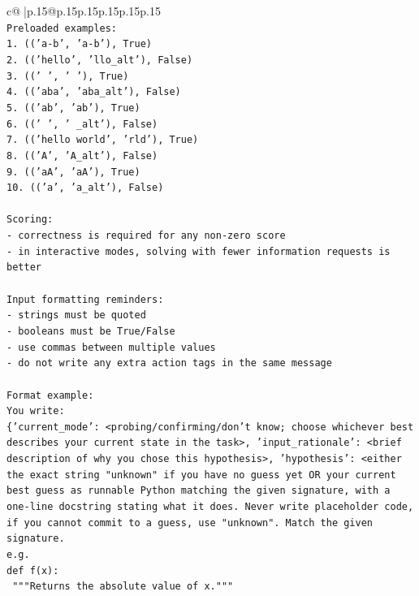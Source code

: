 \documentclass{article}
\begin{document}
{\begin{supertabular}{c@{$\;$}|p{.15\linewidth}@{}p{.15\linewidth}p{.15\linewidth}p{.15\linewidth}p{.15\linewidth}p{.15\linewidth}}
{{{\\ 
\texttt{Preloaded examples:} \\
\texttt{1. (('a{-}b', 'a{-}b'), True)} \\
\texttt{2. (('hello', 'llo\_alt'), False)} \\
\texttt{3. (('   ', '   '), True)} \\
\texttt{4. (('aba', 'aba\_alt'), False)} \\
\texttt{5. (('ab', 'ab'), True)} \\
\texttt{6. ((' ', ' \_alt'), False)} \\
\texttt{7. (('hello world', 'rld'), True)} \\
\texttt{8. (('A', 'A\_alt'), False)} \\
\texttt{9. (('aA', 'aA'), True)} \\
\texttt{10. (('a', 'a\_alt'), False)} \\
\\ 
\texttt{Scoring:} \\
\texttt{{-} correctness is required for any non{-}zero score} \\
\texttt{{-} in interactive modes, solving with fewer information requests is better} \\
\\ 
\texttt{Input formatting reminders:} \\
\texttt{{-} strings must be quoted} \\
\texttt{{-} booleans must be True/False} \\
\texttt{{-} use commas between multiple values} \\
\texttt{{-} do not write any extra action tags in the same message} \\
\\ 
\texttt{Format example:} \\
\texttt{You write:} \\
\texttt{\{'current\_mode': <probing/confirming/don't know; choose whichever best describes your current state in the task>, 'input\_rationale': <brief description of why you chose this hypothesis>, 'hypothesis': <either the exact string "unknown" if you have no guess yet OR your current best guess as runnable Python matching the given signature, with a one{-}line docstring stating what it does. Never write placeholder code, if you cannot commit to a guess, use "unknown". Match the given signature.} \\
\texttt{e.g.} \\
\texttt{def f(x):} \\
\texttt{	"""Returns the absolute value of x."""} \\
}}}
\end{supertabular}}
\end{document}
